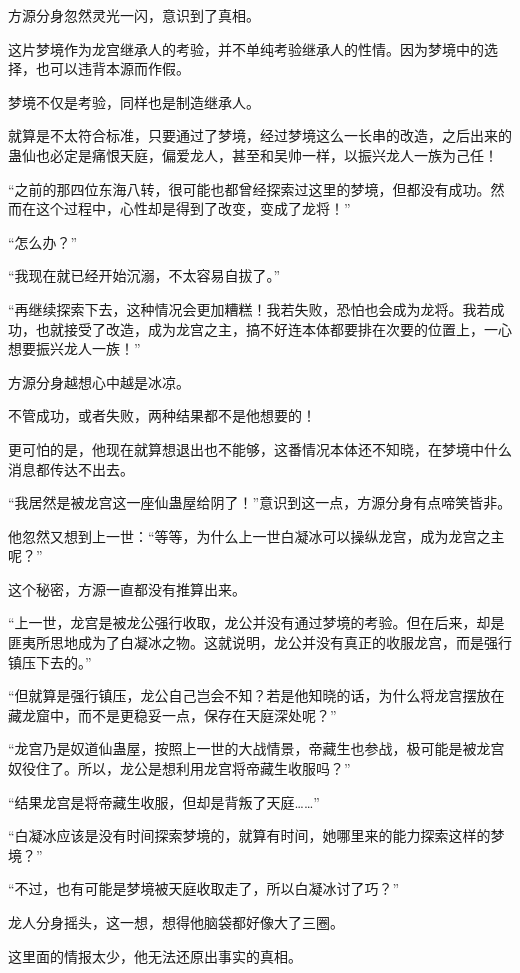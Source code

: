 \begin{this_body}
方源分身忽然灵光一闪，意识到了真相。

这片梦境作为龙宫继承人的考验，并不单纯考验继承人的性情。因为梦境中的选择，也可以违背本源而作假。

梦境不仅是考验，同样也是制造继承人。

就算是不太符合标准，只要通过了梦境，经过梦境这么一长串的改造，之后出来的蛊仙也必定是痛恨天庭，偏爱龙人，甚至和吴帅一样，以振兴龙人一族为己任！

“之前的那四位东海八转，很可能也都曾经探索过这里的梦境，但都没有成功。然而在这个过程中，心性却是得到了改变，变成了龙将！”

“怎么办？”

“我现在就已经开始沉溺，不太容易自拔了。”

“再继续探索下去，这种情况会更加糟糕！我若失败，恐怕也会成为龙将。我若成功，也就接受了改造，成为龙宫之主，搞不好连本体都要排在次要的位置上，一心想要振兴龙人一族！”

方源分身越想心中越是冰凉。

不管成功，或者失败，两种结果都不是他想要的！

更可怕的是，他现在就算想退出也不能够，这番情况本体还不知晓，在梦境中什么消息都传达不出去。

“我居然是被龙宫这一座仙蛊屋给阴了！”意识到这一点，方源分身有点啼笑皆非。

他忽然又想到上一世：“等等，为什么上一世白凝冰可以操纵龙宫，成为龙宫之主呢？”

这个秘密，方源一直都没有推算出来。

“上一世，龙宫是被龙公强行收取，龙公并没有通过梦境的考验。但在后来，却是匪夷所思地成为了白凝冰之物。这就说明，龙公并没有真正的收服龙宫，而是强行镇压下去的。”

“但就算是强行镇压，龙公自己岂会不知？若是他知晓的话，为什么将龙宫摆放在藏龙窟中，而不是更稳妥一点，保存在天庭深处呢？”

“龙宫乃是奴道仙蛊屋，按照上一世的大战情景，帝藏生也参战，极可能是被龙宫奴役住了。所以，龙公是想利用龙宫将帝藏生收服吗？”

“结果龙宫是将帝藏生收服，但却是背叛了天庭……”

“白凝冰应该是没有时间探索梦境的，就算有时间，她哪里来的能力探索这样的梦境？”

“不过，也有可能是梦境被天庭收取走了，所以白凝冰讨了巧？”

龙人分身摇头，这一想，想得他脑袋都好像大了三圈。

这里面的情报太少，他无法还原出事实的真相。


\end{this_body}
